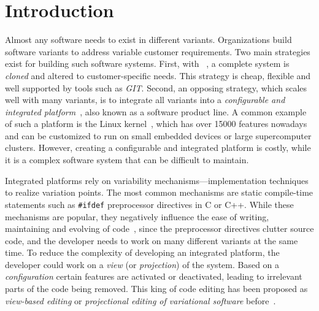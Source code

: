 \chapter{Introduction}\label{sec:introduction}
Almost any software needs to exist in different variants. Organizations build software variants to address variable customer requirements.
Two main strategies exist for building such software systems. First, with
\emph{\co}~\cite{dubinsky2013exploratory}, a complete system 
is \emph{cloned} and altered to customer-specific needs. This strategy is
cheap, flexible and well supported by tools such as \emph{GIT}. Second, an opposing
strategy, which scales well with many variants, is to integrate
all variants into a \emph{configurable and integrated platform}~\cite{van2007software}, also known as a software product line.
A common example of such a platform is the Linux kernel~\cite{she2010variability}, which has over 15000
features nowadays and can be customized to run on small embedded devices or large supercomputer clusters. 
However, creating a configurable and integrated platform is costly, while it is a complex software system that can be difficult to maintain.

Integrated platforms rely on variability mechanisms---implementation techniques to realize variation points.
The most common mechanisms are static compile-time statements such as
\texttt{\#ifdef} preprocessor directives in C or C++.
While these mechanisms are popular, they negatively influence
the ease of writing, maintaining and evolving of code~\cite{favre1996preprocessors, spencer1992}, since the preprocessor directives clutter source code, and the developer needs to work on many different variants at the same time.
To reduce the complexity of developing an integrated platform, the developer could work on a \emph{view} (or \emph{projection})
of the system. Based on a \emph{configuration} certain features are activated
or deactivated, leading to irrelevant parts of the code being removed. 
This king of code editing has been proposed as \emph{view-based editing} or \emph{projectional editing of variational software} before~\cite{walkingshaw2014, le2011ifdef, kastner2008}.

